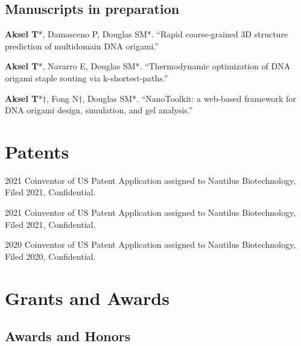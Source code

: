 \documentclass[12pt,letterpaper]{report}
\begin{document}
    \subsection*{Manuscripts in preparation}

    \begin{tablist}

        \item[\the\year] \tab{}\textbf{Aksel T}*, Damasceno P, Douglas SM*. \enquote{Rapid coarse-grained 3D structure prediction of multidomain DNA origami.}

        \item[\the\year] \tab{}\textbf{Aksel T}*, Navarro E, Douglas SM*. \enquote{Thermodynamic optimization of DNA origami staple routing via k-shortest-paths.}

        \item[\the\year] \tab{}\textbf{Aksel T}*†, Fong N†, Douglas SM*. \enquote{NanoToolkit: a web-based framework for DNA origami design, simulation, and gel analysis.}

    \end{tablist}
    
    \section*{Patents}

    \begin{tablist}

        \item[2021] \tab{}Coinventor of US Patent Application assigned to Nautilus Biotechnology, Filed 2021, Confidential.
        \item[2021] \tab{}Coinventor of US Patent Application assigned to Nautilus Biotechnology, Filed 2021, Confidential.
        \item[2020] \tab{}Coinventor of US Patent Application assigned to Nautilus Biotechnology, Filed 2020, Confidential.

    \end{tablist}

    \section*{Grants and Awards}

    \subsection*{Awards and Honors}
\end{document}

